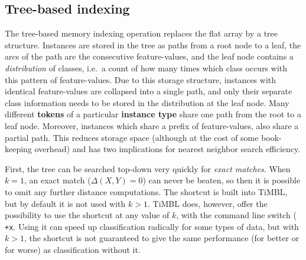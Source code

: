 \documentclass{report}
\begin{document}
\subsection{Tree-based indexing}

The tree-based memory indexing operation replaces the flat array
by a tree structure. Instances are stored in the tree as
paths from a root node to a leaf, the arcs of the path are the
consecutive feature-values, and the leaf node contains a {\em
distribution}\/ of classes, i.e.~a count of how many times which class
occurs with this pattern of feature-values. %
Due to this storage structure, instances with identical feature-values
are collapsed into a single path, and only their separate class
information needs to be stored in the distribution at the leaf
node. Many different {\bf tokens} of a particular {\bf instance type}
share one path from the root to a leaf node. Moreover, instances which
share a prefix of feature-values, also share a partial path. This
reduces storage space (although at the cost of some book-keeping
overhead) and has two implications for nearest neighbor search
efficiency.



First, the tree can be searched top-down very quickly for {\em exact
  matches}. When $k=1$, an exact match ($\Delta(X,Y)=0$) can never be
beaten, so then it is possible to omit any further distance
computations. The shortcut is built into TiMBL, but by default it is
not used with $k>1$. TiMBL does, however, offer the possibility to use
the shortcut at any value of $k$, with the command line switch ({\tt
  +x}. Using it can speed up classification radically for some types
of data, but with $k>1$, the shortcut is not guaranteed to give the
same performance (for better or for worse) as classification without
it.
\end{document}
